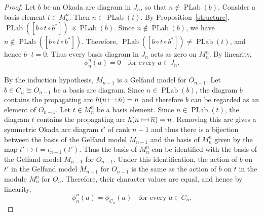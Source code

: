 \documentclass[12pt,reqno]{amsart}
\numberwithin{equation}{section}
\theoremstyle{definition}
\theoremstyle{definition}
\newcommand{\PLab}{\operatorname{PLab}}
\newcommand{\arcjoin}{\mathrel{%
  \rule[0.1ex]{0.4pt}{1.1ex}%
  \rule[0.6ex]{1em}{0.4pt}%
  \rule[0.1ex]{0.4pt}{1.1ex}%
}}
\begin{document}
\begin{proof}
Let $b$ be an Okada arc diagram in $J_n$, so that
$n\notin \PLab(b)$.
Consider a basis element $t\in M_n^n$. Then
$n\in \PLab(t)$.
By Proposition~\ref{structure},
$\PLab([b\circ t\circ b^*])
\preccurlyeq \PLab(b)$.
Since $n\notin \PLab(b)$, we have
$n\notin \PLab([b\circ t\circ b^*])$.
Therefore,
$\PLab([b\circ t\circ b^*])
\neq \PLab(t)$,
and hence
$b\cdot t=0$.
Thus every basis diagram in $J_n$ acts as zero on $M_n^n$. By linearity,
\begin{equation*}
\phi_n^n(a)=0
\quad
\text{for every }a\in J_n.
\end{equation*}


By the induction hypothesis, $M_{n-1}$ is a Gelfand model for $O_{n-1}$.
Let $b\in C_n \cong O_{n-1}$ be a basis arc diagram. Since
$n\in \PLab(b)$,
the diagram $b$ contains the propagating arc $h(n \arcjoin \overline{n})=n$ and therefore $b$ can be regarded as an element of $O_{n-1}$. Let $t\in M_n^n$ be a basis element. Since
$n\in \PLab(t)$,
the diagram $t$ contains the propagating arc $h(n \arcjoin \overline{n})=n$. Removing this arc gives a symmetric Okada arc diagram $t'$ of rank $n-1$ and thus there is a bijection between the basis of the Gelfand model $M_{n-1}$ and the basis of $M_n^n$ given by the map $t'\mapsto t= \iota_{n-1}(t')$. Thus the basis of $M_n^n$ can be identified with the basis of the Gelfand model $M_{n-1}$ for $O_{n-1}$.
Under this identification, the action of $b$ on $t'$ in the Gelfand model $M_{n-1}$ for $O_{n-1}$ is the same as the action of $b$ on $t$ in the module $M_n^n$ for $O_n$. Therefore, their character values are equal, and hence by linearity,
\begin{equation*}
\phi_n^n(a)=\phi_{C_n}(a) \quad \text{for every }a\in C_n.
\end{equation*}



\end{proof}
\end{document}
